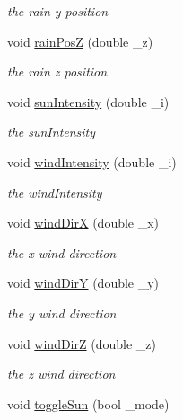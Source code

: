 \begin{DoxyCompactItemize}
\begin{DoxyCompactList}\small\item\em the rain y position \item\end{DoxyCompactList}\item 
void \hyperlink{classGLWindow_a9f28763b9abe09e2d68f840b3b57340b}{rainPosZ} (double \_\-z)
\begin{DoxyCompactList}\small\item\em the rain z position \item\end{DoxyCompactList}\item 
void \hyperlink{classGLWindow_a4450d20ea4eb92fca33310ee1d1e6cbf}{sunIntensity} (double \_\-i)
\begin{DoxyCompactList}\small\item\em the sunIntensity \item\end{DoxyCompactList}\item 
void \hyperlink{classGLWindow_a6863e8f482390cdef48a9eaceb7d9bd3}{windIntensity} (double \_\-i)
\begin{DoxyCompactList}\small\item\em the windIntensity \item\end{DoxyCompactList}\item 
void \hyperlink{classGLWindow_a626fbb233dd4a880023fafd167ec64f6}{windDirX} (double \_\-x)
\begin{DoxyCompactList}\small\item\em the x wind direction \item\end{DoxyCompactList}\item 
void \hyperlink{classGLWindow_acb067f37bf1e0756352b02f8674e3d41}{windDirY} (double \_\-y)
\begin{DoxyCompactList}\small\item\em the y wind direction \item\end{DoxyCompactList}\item 
void \hyperlink{classGLWindow_a06407e4c5767e7aa5488974929a1a2aa}{windDirZ} (double \_\-z)
\begin{DoxyCompactList}\small\item\em the z wind direction \item\end{DoxyCompactList}\item 
void \hyperlink{classGLWindow_aeedee6984783d525d457f61c6f83ee94}{toggleSun} (bool \_\-mode)

\end{DoxyCompactItemize}
